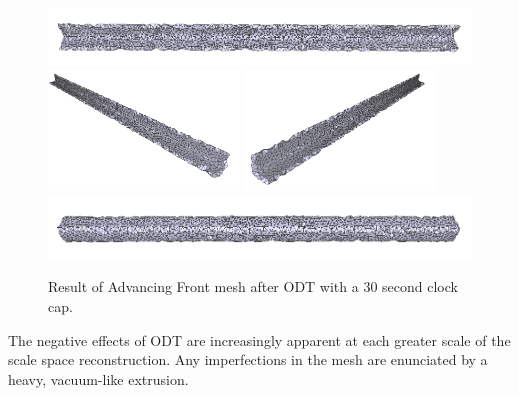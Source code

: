 \documentclass[12pt]{drexelthesis}
\begin{document}
\begin{figure}[!ht]
	\centering
		\includegraphics[width=5in]{simulated-lab-scan/0noise/optimizedNeat/advancingfrontodt00.png}
		\includegraphics[width=2in]{simulated-lab-scan/0noise/optimizedNeat/advancingfrontodt01.png}
		\includegraphics[width=2in]{simulated-lab-scan/0noise/optimizedNeat/advancingfrontodt02.png}
		\includegraphics[width=5in]{simulated-lab-scan/0noise/optimizedNeat/advancingfrontodt03.png}
		\caption[Advancing Front mesh after ODT with a 30 second clock cap]{\centering  Result of Advancing Front mesh after ODT with a 30 second clock cap.}
	\label{zeronoise:advancedodt}
\end{figure}

The negative effects of ODT are increasingly apparent at each greater scale of the scale space reconstruction. Any imperfections in the mesh are enunciated by a heavy, vacuum-like extrusion.
\end{document}
